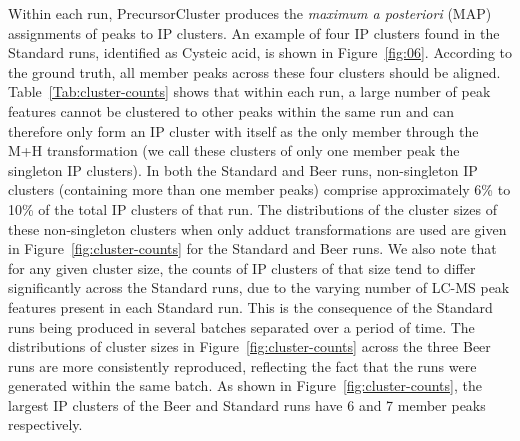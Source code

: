 Within each run, PrecursorCluster produces the \textit{maximum a posteriori} (MAP) assignments of peaks to IP clusters. An example of four IP clusters found in the Standard runs, identified as Cysteic acid, is shown in Figure~\ref{fig:06}. According to the ground truth, all member peaks across these four clusters should be aligned. Table~\ref{Tab:cluster-counts} shows that within each run, a large number of peak features cannot be clustered to other peaks within the same run and can therefore only form an IP cluster with itself as the only member through the M+H transformation (we call these clusters of only one member peak the singleton IP clusters). In both the Standard and Beer runs, non-singleton IP clusters (containing more than one member peaks) comprise approximately 6\% to 10\% of the total IP clusters of that run. The distributions of the cluster sizes of these non-singleton clusters when only adduct transformations are used are given in Figure~\ref{fig:cluster-counts} for the Standard and Beer runs. We also note that for any given cluster size, the counts of IP clusters of that size tend to differ significantly across the Standard runs, due to the varying number of LC-MS peak features present in each Standard run. This is the consequence of the Standard runs being produced in several batches separated over a period of time. The distributions of cluster sizes in Figure~\ref{fig:cluster-counts} across the three Beer runs are more consistently reproduced, reflecting the fact that the runs were generated within the same batch. As shown in Figure~\ref{fig:cluster-counts}, the largest IP clusters of the Beer and Standard runs have 6 and 7 member peaks respectively. 

